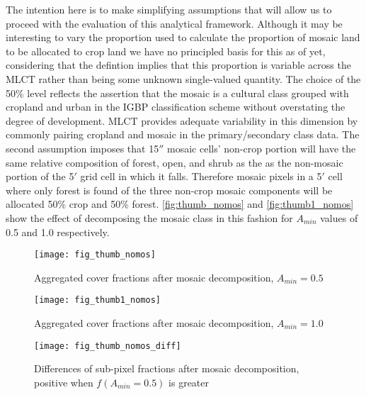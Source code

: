 The intention here is to make simplifying assumptions that will allow
us to proceed with the evaluation of this analytical framework.
Although it may be interesting to vary the proportion used to
calculate the proportion of mosaic land to be allocated to crop land
we have no principled basis for this as of yet, considering that the
defintion implies that this proportion is variable across the MLCT
rather than being some unknown single-valued quantity.  The choice of
the 50\% level reflects the assertion that the mosaic is a cultural
class grouped with cropland and urban in the IGBP classification
scheme without overstating the degree of development.  MLCT provides
adequate variability in this dimension by commonly pairing cropland
and mosaic in the primary/secondary class data.  The second assumption
imposes that 15$''$ mosaic cells' non-crop portion will have the same
relative composition of forest, open, and shrub as the as the
non-mosaic portion of the 5$'$ grid cell in which it falls. Therefore
mosaic pixels in a 5$'$ cell where only forest is found of the three
non-crop mosaic components will be allocated 50\% crop and 50\%
forest.  \autoref{fig:thumb_nomos} and \autoref{fig:thumb1_nomos} show
the effect of decomposing the mosaic class in this fashion for
$A_{min}$ values of 0.5 and 1.0 respectively.



\begin{figure}[hpt]
\begin{center}
  


\texttt{[image: fig\_thumb\_nomos]}
\end{center} 
\caption{Aggregated cover fractions after mosaic decomposition, $A_{min}=0.5$}
\label{fig:thumb_nomos}
\end{figure} 

\begin{figure}[hpt]
\begin{center}
  


\texttt{[image: fig\_thumb1\_nomos]}
\end{center} 
\caption{Aggregated cover fractions after mosaic decomposition, $A_{min}=1.0$}
\label{fig:thumb1_nomos}
\end{figure} 



\begin{figure}[hpt]
\begin{center}
  

\texttt{[image: fig\_thumb\_nomos\_diff]}
\end{center} 
\caption{Differences of sub-pixel fractions after mosaic
  decomposition, positive when $f(A_{min} = 0.5)$ is greater}
\label{fig:thumb_nomos_diff}
\end{figure} 





